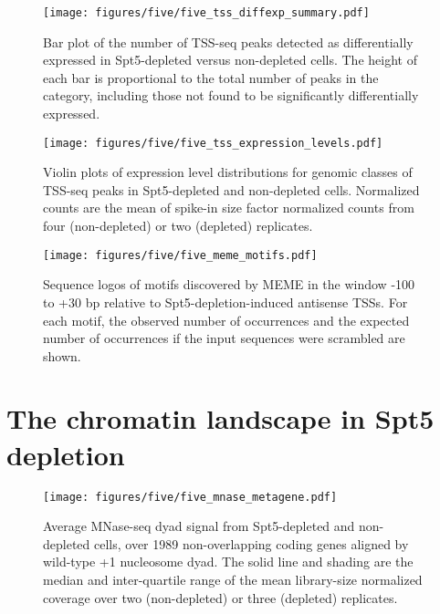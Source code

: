 \begin{figure}[h]
    \centering
    \begin{minipage}[t]{2.875in}
        \centering
        \texttt{[image: figures/five/five\_tss\_diffexp\_summary.pdf]}
        \caption[Bar plot of the number of TSS-seq peaks in various genomic classes detected as differentially expressed in Spt5-depleted versus non-depleted cells.]{Bar plot of the number of TSS-seq peaks detected as differentially expressed in Spt5-depleted versus non-depleted cells. The height of each bar is proportional to the total number of peaks in the category, including those not found to be significantly differentially expressed.}
        \label{fig:five_tss_diffexp_summary}
    \end{minipage}\hfill
    \begin{minipage}[t]{2.875in}
        \centering
        \texttt{[image: figures/five/five\_tss\_expression\_levels.pdf]}
        \caption[Violin plots of expression level distributions for genomic classes of TSS-seq peaks in Spt5-depleted and non-depleted cells.]{Violin plots of expression level distributions for genomic classes of TSS-seq peaks in Spt5-depleted and non-depleted cells. Normalized counts are the mean of spike-in size factor normalized counts from four (non-depleted) or two (depleted) replicates.}
        \label{fig:five_tss_expression_levels}
    \end{minipage}
\end{figure}

\begin{figure}[h]
    \centering
    \texttt{[image: figures/five/five\_meme\_motifs.pdf]}
    \caption[Sequence logos of motifs discovered by MEME upstream of Spt5-depletion-induced antisense TSSs.]{Sequence logos of motifs discovered by MEME \citep{bailey2015} in the window -100 to +30 bp relative to Spt5-depletion-induced antisense TSSs. For each motif, the observed number of occurrences and the expected number of occurrences if the input sequences were scrambled are shown.}
    \label{fig:five_meme_motifs}
\end{figure}

\clearpage

\section{The chromatin landscape in Spt5 depletion}

\begin{wrapfigure}[13]{r}{3in}
    \texttt{[image: figures/five/five\_mnase\_metagene.pdf]}
    \caption[Average MNase-seq dyad signal from Spt5-depleted and non-depleted cells, over non-overlapping coding genes.]{Average MNase-seq dyad signal from Spt5-depleted and non-depleted cells, over 1989 non-overlapping coding genes aligned by wild-type +1 nucleosome dyad. The solid line and shading are the median and inter-quartile range of the mean library-size normalized coverage over two (non-depleted) or three (depleted) replicates.}
    \label{fig:five_mnase_metagene}
\end{wrapfigure}

